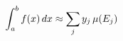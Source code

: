 \documentclass[preview]{standalone}
\begin{document}
\begin{align*}
\special{dvisvgm:raw <g id='unique000'>}\int_a^b f(x) \, dx \approx \sum_j y_j \, \mu(E_j)\special{dvisvgm:raw </g>}
\end{align*}
\end{document}

